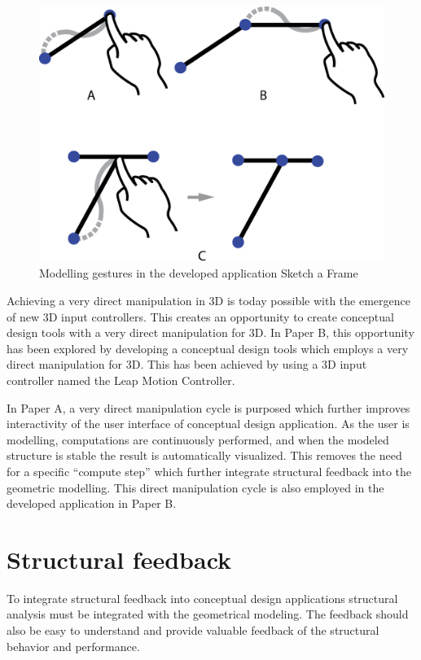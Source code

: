 \begin{figure}
  \includegraphics[width=330pt]{graphics/interaction.eps}
  \caption{Modelling gestures in the developed application Sketch a Frame}
  \label{fig:interaction}
\end{figure}

Achieving a very direct manipulation in 3D is today possible with the emergence of new 3D input controllers. This creates an opportunity to create conceptual design tools with a very direct manipulation for 3D. In Paper B, this opportunity has been explored by developing a conceptual design tools which employs a very direct manipulation for 3D. This has been achieved by using a 3D input controller named the Leap Motion Controller. 

In Paper A, a very direct manipulation cycle is purposed which further improves interactivity of the user interface of conceptual design application. As the user is modelling, computations are continuously performed, and when the modeled structure is stable the result is automatically visualized. This removes the need for a specific “compute step” which further integrate structural feedback into the geometric modelling. This direct manipulation cycle is also employed in the developed application in Paper B.

\section{Structural feedback}
To integrate structural feedback into conceptual design applications structural analysis must be integrated with the geometrical modeling. The feedback should also be easy to understand and provide valuable feedback of the structural behavior and performance.

